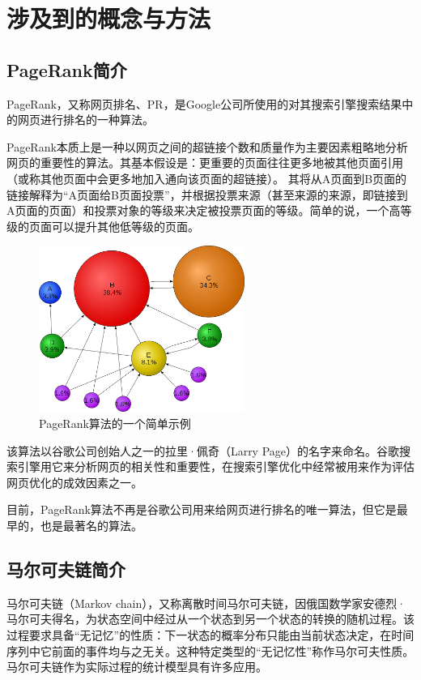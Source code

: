 \documentclass[UTF8,openany]{ctexbook}
\begin{document}
\section[涉及到的概念与方法]{涉及到的概念与方法}
\subsection[PageRank简介]{PageRank简介}
PageRank，又称网页排名、PR，是Google公司所使用的对其搜索引擎搜索结果中的网页进行排名的一种算法。

PageRank本质上是一种以网页之间的超链接个数和质量作为主要因素粗略地分析网页的重要性的算法。其基本假设是：更重要的页面往往更多地被其他页面引用（或称其他页面中会更多地加入通向该页面的超链接）。 其将从A页面到B页面的链接解释为“A页面给B页面投票”，并根据投票来源（甚至来源的来源，即链接到A页面的页面）和投票对象的等级来决定被投票页面的等级。简单的说，一个高等级的页面可以提升其他低等级的页面。

\begin{figure}[H]
    \begin{center}
        \includegraphics[width=0.6\textwidth]{images/PageRanks-Example.svg.png}
        \caption{PageRank算法的一个简单示例}
    \end{center}
\end{figure}

该算法以谷歌公司创始人之一的拉里·佩奇（Larry Page）的名字来命名。谷歌搜索引擎用它来分析网页的相关性和重要性，在搜索引擎优化中经常被用来作为评估网页优化的成效因素之一。

目前，PageRank算法不再是谷歌公司用来给网页进行排名的唯一算法，但它是最早的，也是最著名的算法。



\subsection[马尔可夫链简介]{马尔可夫链简介}
马尔可夫链（Markov chain），又称离散时间马尔可夫链，因俄国数学家安德烈·马尔可夫得名，为状态空间中经过从一个状态到另一个状态的转换的随机过程。该过程要求具备“无记忆”的性质：下一状态的概率分布只能由当前状态决定，在时间序列中它前面的事件均与之无关。这种特定类型的“无记忆性”称作马尔可夫性质。马尔可夫链作为实际过程的统计模型具有许多应用。
\end{document}
